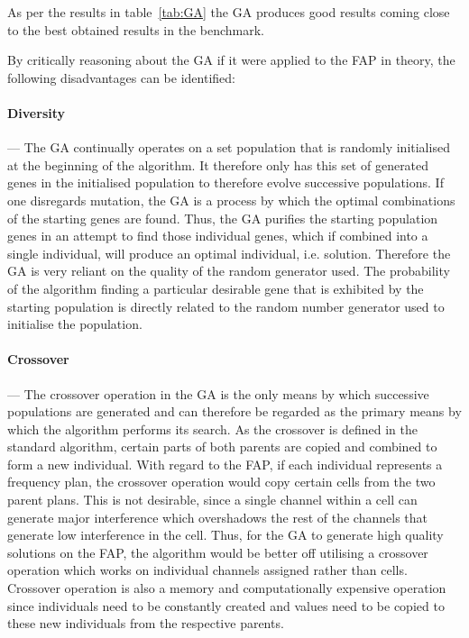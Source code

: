 As per the results in table~\ref{tab:GA} the \gls{GA} produces good results coming close to the best obtained results in the benchmark. 

By critically reasoning about the \gls{GA} if it were applied to the \gls{FAP} in theory, the following disadvantages can be identified:

\paragraph{Diversity}
--- The \gls{GA} continually operates on a set population that is randomly initialised at the beginning of the algorithm. It therefore only has this set of generated genes in the initialised population to therefore evolve successive populations.
If one disregards mutation, the \gls{GA} is a process by which the optimal combinations of the starting genes are found. Thus, the \gls{GA} purifies the starting population genes in an attempt to find those individual genes, which if combined into a single individual, will produce an optimal individual, i.e. solution. Therefore the \gls{GA} is very reliant on the quality of the random generator used. The probability of the algorithm finding a particular desirable gene that is exhibited by the starting population is directly related to the random number generator used to initialise the population. 
\paragraph{Crossover}
--- The crossover operation in the \gls{GA} is the only means by which successive populations are generated and can therefore be regarded as the primary means by which the algorithm performs its search. As the crossover is defined in the standard algorithm, certain parts of both parents are copied and combined to form a new individual. With regard to the \gls{FAP}, if each individual represents a frequency plan, the crossover operation would copy certain cells from the two parent plans. This is not desirable, since a single channel within a cell can generate major interference which overshadows the rest of the channels that generate low interference in the cell. Thus, for the \gls{GA} to generate high quality solutions on the \gls{FAP}, the algorithm would be better off utilising a crossover operation which works on individual channels assigned rather than cells. Crossover operation is also a memory and computationally expensive operation since individuals need to be constantly created and values need to be copied to these new individuals from the respective parents.

